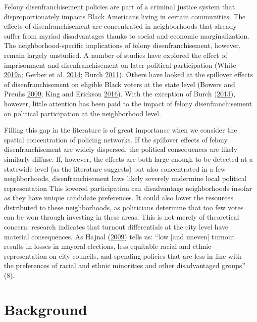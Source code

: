 \documentclass[12pt,]{article}
\begin{document}
Felony disenfranchisement policies are part of a criminal justice system that disproportionately impacts Black Americans living in certain communities. The effects of disenfranchisement are concentrated in neighborhoods that already suffer from myriad disadvantages thanks to social and economic marginalization. The neighborhood-specific implications of felony disenfranchisement, however, remain largely unstudied. A number of studies have explored the effect of imprisonment and disenfranchisement on later political participation (White \protect\hyperlink{ref-White2019}{2019}\protect\hyperlink{ref-White2019}{a}; Gerber et al. \protect\hyperlink{ref-Gerber2014}{2014}; Burch \protect\hyperlink{ref-Burch2011}{2011}). Others have looked at the spillover effects of disenfranchisement on eligible Black voters at the state level (Bowers and Preuhs \protect\hyperlink{ref-Bowers2009}{2009}; King and Erickson \protect\hyperlink{ref-King2016}{2016}). With the exception of Burch (\protect\hyperlink{ref-Burch2013}{2013}), however, little attention has been paid to the impact of felony disenfranchisement on political participation at the neighborhood level.

Filling this gap in the literature is of great importance when we consider the spatial concentration of policing networks. If the spillover effects of felony disenfranchisement are widely dispersed, the political consequences are likely similarly diffuse. If, however, the effects are both large enough to be detected at a statewide level (as the literature suggests) but also concentrated in a few neighborhoods, disenfranchisement laws likely severely undermine local political representation This lowered participation can disadvantage neighborhoods insofar as they have unique candidate preferences. It could also lower the resources distributed to these neighborhoods, as politicians determine that too few votes can be won through investing in these areas. This is not merely of theoretical concern: research indicates that turnout differentials at the city level have material consequences. As Hajnal (\protect\hyperlink{ref-Hajnal2009}{2009}) tells us: ``low {[}and uneven{]} turnout results in losses in mayoral elections, less equitable racial and ethnic representation on city councils, and spending policies that are less in line with the preferences of racial and ethnic minorities and other disadvantaged groups'' (8).

\hypertarget{background}{%
\section*{Background}\label{background}}
\end{document}
